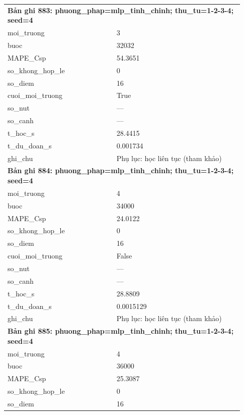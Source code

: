 \begin{longtable}{p{0.43\linewidth}p{0.50\linewidth}}
\midrule
\multicolumn{2}{p{0.95\linewidth}}{\textbf{Bản ghi 883: phuong\_phap=mlp\_tinh\_chinh; thu\_tu=1-2-3-4; seed=4}} \\
moi\_\allowbreak truong & 3 \\
buoc & 32032 \\
MAPE\_\allowbreak Csp & 54.3651 \\
so\_\allowbreak khong\_\allowbreak hop\_\allowbreak le & 0 \\
so\_\allowbreak diem & 16 \\
cuoi\_\allowbreak moi\_\allowbreak truong & True \\
so\_\allowbreak nut & — \\
so\_\allowbreak canh & — \\
t\_\allowbreak hoc\_\allowbreak s & 28.4415 \\
t\_\allowbreak du\_\allowbreak doan\_\allowbreak s & 0.001734 \\
ghi\_\allowbreak chu & Phụ lục: học liên tục (tham khảo) \\
\midrule
\multicolumn{2}{p{0.95\linewidth}}{\textbf{Bản ghi 884: phuong\_phap=mlp\_tinh\_chinh; thu\_tu=1-2-3-4; seed=4}} \\
moi\_\allowbreak truong & 4 \\
buoc & 34000 \\
MAPE\_\allowbreak Csp & 24.0122 \\
so\_\allowbreak khong\_\allowbreak hop\_\allowbreak le & 0 \\
so\_\allowbreak diem & 16 \\
cuoi\_\allowbreak moi\_\allowbreak truong & False \\
so\_\allowbreak nut & — \\
so\_\allowbreak canh & — \\
t\_\allowbreak hoc\_\allowbreak s & 28.8809 \\
t\_\allowbreak du\_\allowbreak doan\_\allowbreak s & 0.0015129 \\
ghi\_\allowbreak chu & Phụ lục: học liên tục (tham khảo) \\
\midrule
\multicolumn{2}{p{0.95\linewidth}}{\textbf{Bản ghi 885: phuong\_phap=mlp\_tinh\_chinh; thu\_tu=1-2-3-4; seed=4}} \\
moi\_\allowbreak truong & 4 \\
buoc & 36000 \\
MAPE\_\allowbreak Csp & 25.3087 \\
so\_\allowbreak khong\_\allowbreak hop\_\allowbreak le & 0 \\
so\_\allowbreak diem & 16 \\

\end{longtable}
